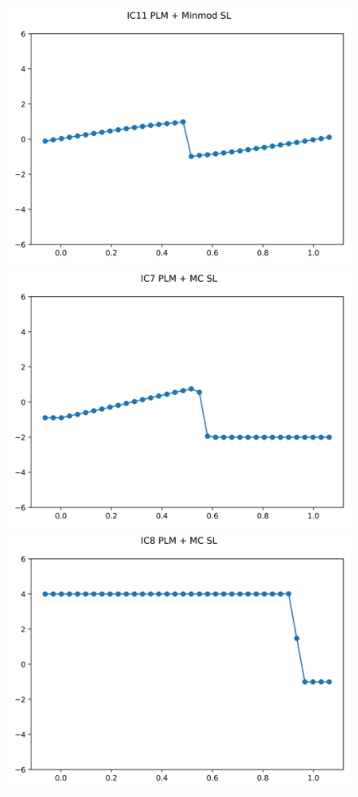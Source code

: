 \documentclass{article}
\begin{document}
\begin{figure}[t]
        \includegraphics[width=.95\textwidth]{../../code/unsafe_IC11Methodpm_plot.png}
    \emp
        \centering
        \includegraphics[width=.95\textwidth]{../../code/unsafe_IC7Methodpo_plot.png}
        \includegraphics[width=.95\textwidth]{../../code/unsafe_IC8Methodpo_plot.png}

\end{figure}
\end{document}
